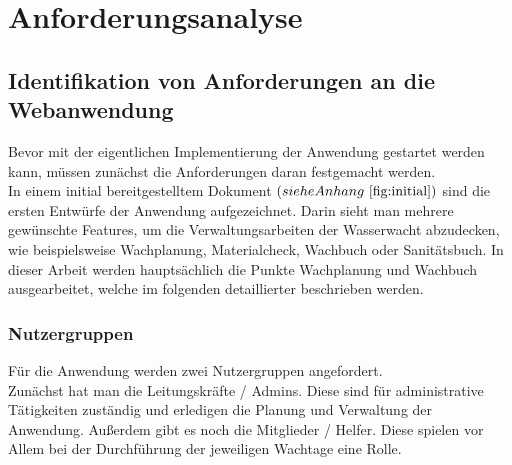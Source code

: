 \documentclass[fontsize=12pt,openright,oneside,paper=a4,BCOR=1cm]{scrbook}
\begin{document}






%
%

\chapter{Anforderungsanalyse}
\section{Identifikation von Anforderungen an die Webanwendung} 
Bevor mit der eigentlichen Implementierung der Anwendung gestartet werden kann, müssen zunächst die Anforderungen daran festgemacht werden. \\
In einem initial bereitgestelltem Dokument $(siehe Anhang ~\ref{fig:initial})$ sind die ersten Entwürfe der Anwendung aufgezeichnet. Darin sieht man mehrere gewünschte Features, um die Verwaltungsarbeiten der Wasserwacht abzudecken, wie beispielsweise \glqq Wachplanung\grqq{}, \glqq Materialcheck\grqq{}, \glqq Wachbuch\grqq{} oder \glqq Sanitätsbuch\grqq{}. In dieser Arbeit werden hauptsächlich die Punkte \glqq Wachplanung\grqq{} und \glqq Wachbuch\grqq{} ausgearbeitet, welche im folgenden detaillierter beschrieben werden. \\ 

\subsection{Nutzergruppen}
Für die Anwendung werden zwei Nutzergruppen angefordert. \\
Zunächst hat man die \glqq Leitungskräfte / Admins\grqq{}. Diese sind für administrative Tätigkeiten zuständig und erledigen die Planung und Verwaltung der Anwendung. 
Außerdem gibt es noch die \glqq Mitglieder / Helfer\grqq{}. Diese spielen vor Allem bei der Durchführung der jeweiligen Wachtage eine Rolle.
\end{document}
